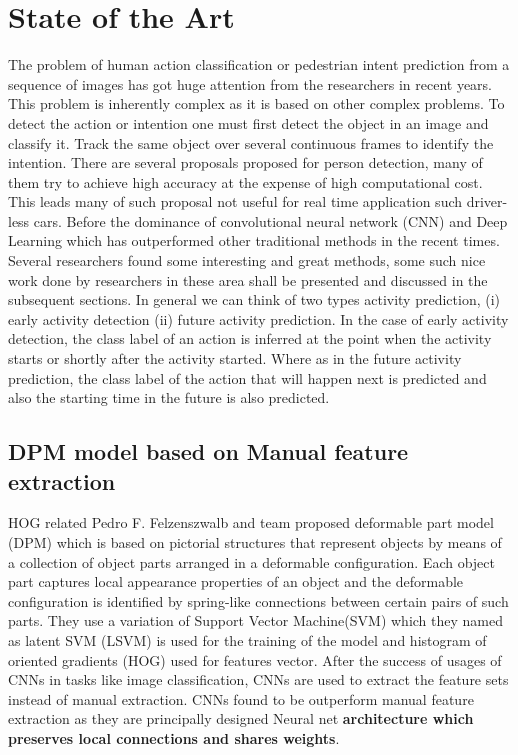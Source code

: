 \chapter{State of the Art}
The problem of human action classification or pedestrian intent prediction from a sequence of images has got huge attention from the researchers in recent years. 
This problem is inherently complex as it is based on other 
complex problems. To detect the action or intention one must first detect the object in an image and classify it. Track the same object over several continuous frames to identify the intention. There are several proposals proposed for person detection, many of them try to achieve high accuracy at the expense of high computational cost. This leads many of such proposal not useful for real time application such driver-less cars.   
Before the dominance of convolutional neural network (CNN) and Deep Learning which has outperformed other traditional methods in the recent times. Several researchers found some interesting and great methods, some such nice work done by researchers in these area shall be presented and discussed in the subsequent sections. In general we can think of two types activity prediction, (i) early activity detection (ii) future activity prediction. In the case of early activity detection, the class label of an action is inferred at the point when the activity starts or shortly after the activity started. Where as in the future activity prediction, the class label of the action that will happen next is predicted and also the starting time in the future is also predicted.
 
\section{DPM model based on Manual feature extraction}
\newpara HOG related
\newpara
Pedro F. Felzenszwalb and team proposed deformable part model (DPM) \cite{felzenszwalb2009object} which is based on pictorial structures that represent objects by means of a collection of object parts arranged in a deformable configuration. Each object part captures local appearance properties of
an object and the deformable configuration is identified  by spring-like connections between certain pairs of such parts. They use a variation of Support Vector Machine(SVM) which they named as latent SVM (LSVM) is used for the training of the model and  histogram of oriented gradients (HOG) used for features vector. After the success of usages of CNNs in tasks like image classification, CNNs are used to extract the feature sets instead of manual extraction. CNNs found to be outperform manual feature extraction as they are principally designed Neural net \textbf{architecture which preserves local connections and shares weights}.

